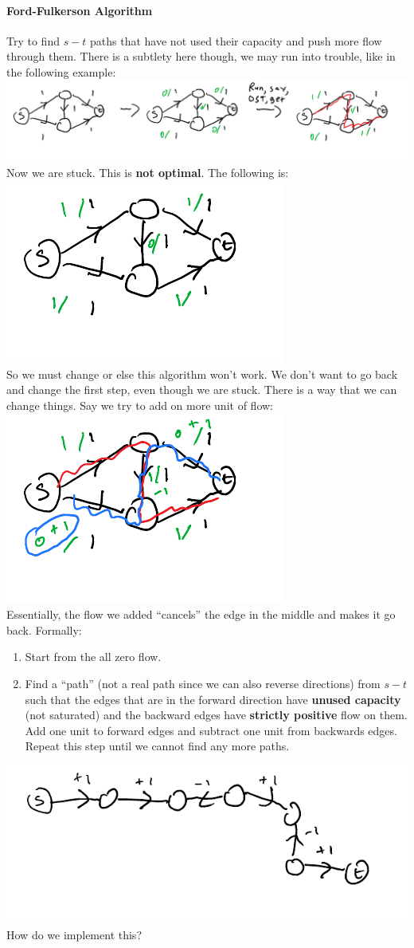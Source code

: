 \documentclass[12 pt]{article}
\begin{document}
        \paragraph{Ford-Fulkerson Algorithm}
        Try to find $s-t$ paths that have not used their capacity and
        push more flow through them. There is a subtlety here
        though, we may run into trouble, like in the following example:
        \\ \includegraphics[width=\textwidth]{i6.pdf}
        \\ Now we are stuck. This is \textbf{not optimal}. The
        following is:
        \\ \includegraphics[width=.3\textwidth]{i7.pdf}
        \\ So we must change or else this algorithm won't work. We
        don't want to go back and change the first step, even though
        we are stuck. There is a way that we can change things. Say we
        try to add on more unit of flow:
        \\ \includegraphics[width=.3\textwidth]{i8.pdf}
        \\ Essentially, the flow we added ``cancels'' the edge in the
        middle and makes it go back. Formally:
        \begin{enumerate}
        \item Start from the all zero flow.
        \item Find a ``path'' (not a real path since we can also
          reverse directions) from $s-t$ such that the edges that are
          in the forward direction have \textbf{unused capacity} (not
          saturated) and the backward edges have \textbf{strictly positive}
          flow on them. Add one unit to forward edges and subtract one
          unit from backwards edges. Repeat this step until we cannot
          find any more paths.
        \end{enumerate}
        \includegraphics[width=.5\textwidth]{i9.pdf}
        \\ How do we implement this?
\end{document}
